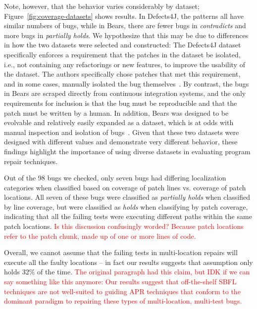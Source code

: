\documentclass[10pt, conference]{IEEEtran}
\newcommand\todo[1]{\textcolor{red}{#1}}
\begin{document}
Note, however, that the behavior varies considerably by dataset;
Figure~\ref{fig:coverage-datasets} shows results. In Defects4J, the patterns all have similar 
numbers of bugs, while in Bears, there are fewer bugs in \emph{contradicts} and more  bugs in 
\emph{partially holds}.
We hypothesize that this may be due to differences in how the two  
datasets were selected and constructed:
The Defects4J dataset specifically enforces a requirement that the patches in the 
dataset be isolated, i.e., not containing any refactorings or new features, to improve the 
usability of the dataset. The authors specifically chose patches that met this requirement, 
and in some cases, manually isolated the bug themselves~\cite{defects4j}. By contrast, the 
bugs in 
Bears are scraped directly from continuous integration systems, and the 
only requirements for inclusion is that the bug must be reproducible and that
the patch must be written by a human. In addition, Bears was designed to be evolvable 
and relatively easily expanded as a dataset, which is at odds with manual inspection and isolation of 
bugs~\cite{bears}.
Given that these two datasets were designed with different values and demonstrate very 
different behavior, these findings highlight the importance of using diverse datasets in 
evaluating program repair techniques.

Out of the 98 bugs we checked, only seven bugs had differing localization categories when 
classified based on coverage of patch lines vs. coverage of patch locations. All seven of these 
bugs 
were classified as \emph{partially holds} when classified by line coverage, but were classified as 
\emph{holds} when classifying by patch coverage, indicating that all the failing tests were 
executing different paths within the same patch locations. \todo{Is this discussion confusingly 
worded? Because patch locations refer to the patch chunk, made up of one or more lines of 
code.}

Overall, we cannot assume that the failing tests in multi-location repairs will execute all the 
faulty locations -- in fact our results suggests that assumption only holds 32\% of the time. 
\todo{The original paragraph had this claim, but IDK if we can say something like this anymore:
Our results suggest that off-the-shelf SBFL techniques are not
well-suited to guiding APR techniques that conform to the dominant paradigm to repairing
these types of multi-location, multi-test bugs.}
\end{document}
